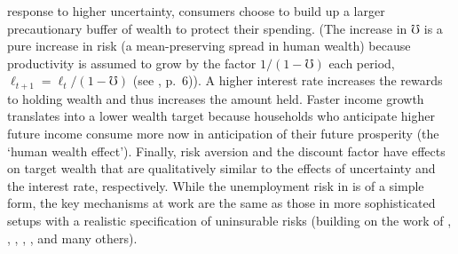 \documentclass[titlepage]{\econtex}
\begin{document}
response to higher uncertainty, consumers choose to build up a larger
precautionary buffer of wealth to protect their spending.  (The increase in $\mho$ is a pure increase in risk (a mean-preserving spread in human wealth) because
  productivity is assumed to grow by the factor $1/(1-\mho)$ each
  period, $\ell_{t+1}=\ell_t/(1-\mho)$ (see \cite{ctDiscrete}, p.\ 6)).
  A higher interest rate increases the rewards to holding wealth and thus increases the amount held. Faster income growth translates into a lower wealth target because households who anticipate higher future income consume more now in anticipation of their future prosperity (the `human wealth effect'). Finally, risk aversion and the discount factor have effects on target wealth that are qualitatively similar to the effects of uncertainty and the interest rate, respectively. While the unemployment risk in \cite{ctDiscrete} is of a simple form, the key mechanisms at work are the same as those in more sophisticated setups with a realistic specification of uninsurable risks (building on the work of \cite{bewleyPIH}, \cite{skinner_jme88}, \cite{zeldes_qje89}, \cite{deaton_ecta91}, \cite{carroll:brookings}, \cite{carroll_bufferStockSaving_qje97} and many others).

\begin{comment}
  In our empirical framework, we do not intend to identify the
  slowly-moving deep parameters such as risk aversion or the discount
  rate. Instead, we aim to estimate the dynamics of the target wealth
  with respect to risk, interest rates, and expected income growth:
  \be \check{\mRat}_t=m_0+\delta_\sigma\sigma^{2*}_{t-1}+\delta_r
  \check{\rfree}_{t-1}+\delta_y \Delta
  \PGro_{t-1}+\eta^m_t,\label{mStar} \ee where $\sigma^{2*}$ denotes
  uncertainty, $\check{\rfree}$ is the ex ante real interest rate and
  $\Delta \PGro$ denotes expected income growth. All four starred
  variables are assumed to be unobserved---target wealth is a
  theoretical construct, while the available measure of uncertainty,
  ex ante real interest rates and expected income do not perfectly
  match their (starred) theoretical counterparts.%
  \footnote{    To keep the estimation tractable, we impose a linearity of the
    model and normality of disturbances. While neither holds in
    reality, our estimation approach (which also allows for
    measurement error) yields plausible results and seems to capture
    the key properties of the data well. Ideally, we would like to
    take the estimation one step further by solving, simulating and
    estimating a realistic non-linear model of consumption choice
    under easing credit constraints and uncertainty about the relevant
    variables (including income growth, interest rates and asset
    prices). However, given the current state of knowledge, this is a
    daunting task, well beyond the scope of this paper.  }
\end{comment}
\end{document}
